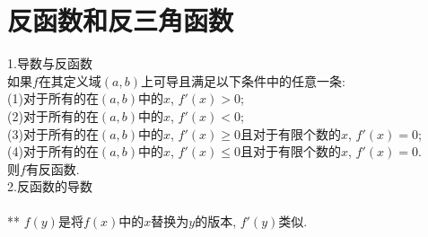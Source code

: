 \chapter{反函数和反三角函数}
1.导数与反函数\\
如果$f$在其定义域$(a,b)$上可导且满足以下条件中的任意一条:\\
(1)对于所有的在$(a,b)$中的$x$, $f'(x)>0$;\\
(2)对于所有的在$(a,b)$中的$x$, $f'(x)<0$;\\
(3)对于所有的在$(a,b)$中的$x$, $f'(x)\geqslant 0$且对于有限个数的$x$, $f'(x)=0$;\\
(4)对于所有的在$(a,b)$中的$x$, $f'(x)\leqslant 0$且对于有限个数的$x$, $f'(x)=0$.\\
则$f$有反函数.\\[2ex]

2.反函数的导数\\[1ex]
\\[1ex]
** $f(y)$是将$f(x)$中的$x$替换为$y$的版本, $f'(y)$类似.\\[2ex]


